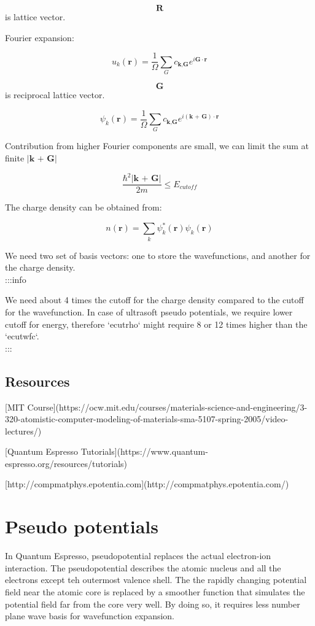 \documentclass{article}
\begin{document}
$$\textbf{R}$$ is lattice vector.

Fourier expansion:

$$
u_k(\textbf{r}) = \frac{1}{\Omega} \sum_G c_{\textbf{k,G}} e^{i \textbf{G} \cdot
\textbf{r}}
$$

$$\textbf{G}$$ is reciprocal lattice vector.

$$
\psi_k(\textbf{r}) = \frac{1}{\Omega} \sum_G c_{\textbf{k,G}}
e^{i (\textbf{k + G}) \cdot \textbf{r}}
$$

Contribution from higher Fourier components are small, we can limit the sum at
finite $|\textbf{k + G}|$

$$
\frac{\hbar^2 |\textbf{k + G}|}{2m} \le E_{cutoff}
$$

The charge density can be obtained from:

$$
n(\textbf{r}) = \sum_k \psi_k^*(\textbf{r}) \psi_k(\textbf{r})
$$

We need two set of basis vectors: one to store the wavefunctions, and another
for the charge density.\\

:::info

We need about 4 times the cutoff for the charge density compared to the cutoff
for the wavefunction. In case of ultrasoft pseudo potentials, we require lower
cutoff for energy, therefore `ecutrho` might require 8 or 12 times higher than
the `ecutwfc`.\\

:::\\

\subsection{Resources}

\item{[MIT Course](https://ocw.mit.edu/courses/materials-science-and-engineering/3-320-atomistic-computer-modeling-of-materials-sma-5107-spring-2005/video-lectures/)}
\item {[Quantum Espresso Tutorials](https://www.quantum-espresso.org/resources/tutorials)}
\item{[http://compmatphys.epotentia.com](http://compmatphys.epotentia.com/)}


\section{Pseudo potentials}
In Quantum Espresso, pseudopotential replaces the actual electron-ion
interaction. The pseudopotential describes the atomic nucleus and all the
electrons except teh outermost valence shell. The the rapidly changing potential
field near the atomic core is replaced by a smoother function that simulates the
potential field far from the core very well. By doing so, it requires less
number plane wave basis for wavefunction expansion.\\
\end{document}
